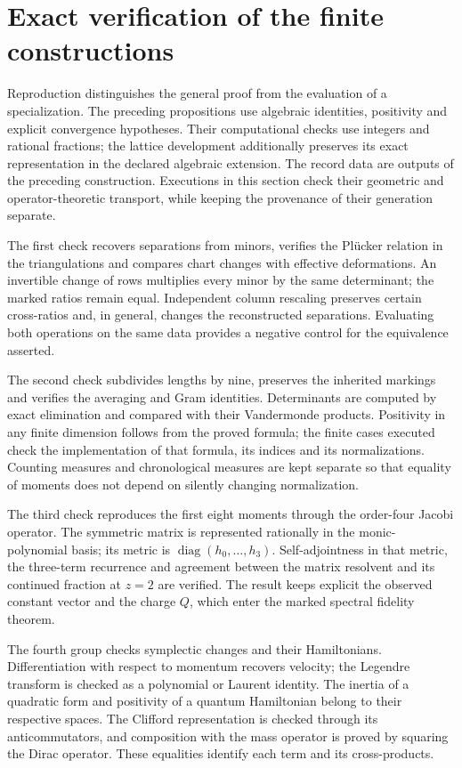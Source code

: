 \section{Exact verification of the finite constructions}
\label{sec:exact-reproduction}

Reproduction distinguishes the general proof from the evaluation of
a specialization. The preceding propositions use algebraic
identities, positivity and explicit convergence hypotheses. Their
computational checks use integers and rational fractions;
the lattice development additionally preserves its exact representation in
the declared algebraic extension. The record data are outputs
of the preceding construction. Executions in this
section check their geometric and operator-theoretic transport, while keeping
the provenance of their generation separate.

The first check recovers separations from minors,
verifies the Plücker relation in the triangulations and compares
chart changes with effective deformations. An invertible change
of rows multiplies every minor by the same determinant;
the marked ratios remain equal. Independent column
rescaling preserves certain cross-ratios and, in general, changes
the reconstructed separations. Evaluating both operations on the
same data provides a negative control for the equivalence
asserted.

The second check subdivides lengths by nine, preserves the
inherited markings and verifies the averaging and Gram identities.
Determinants are computed by exact elimination and compared
with their Vandermonde products. Positivity in any
finite dimension follows from the proved formula; the finite cases
executed check the implementation of that formula, its indices
and its normalizations. Counting measures and chronological
measures are kept separate so that equality of
moments does not depend on silently changing normalization.

The third check reproduces the first eight moments through
the order-four Jacobi operator. The symmetric matrix is
represented rationally in the monic-polynomial basis;
its metric is \(\operatorname{diag}(h_0,\ldots,h_3)\).
Self-adjointness in that metric, the three-term
recurrence and agreement between the matrix resolvent and its continued
fraction at \(z=2\) are verified. The result keeps explicit the observed
constant vector and the charge \(Q\), which enter the
marked spectral fidelity theorem.

The fourth group checks symplectic changes and their
Hamiltonians. Differentiation with respect to momentum recovers
velocity; the Legendre transform is checked as a polynomial
or Laurent identity. The inertia of a quadratic
form and positivity of a quantum Hamiltonian
belong to their respective spaces. The Clifford
representation is checked through its anticommutators,
and composition with the mass operator is proved by
squaring the Dirac operator. These equalities
identify each term and its cross-products.

